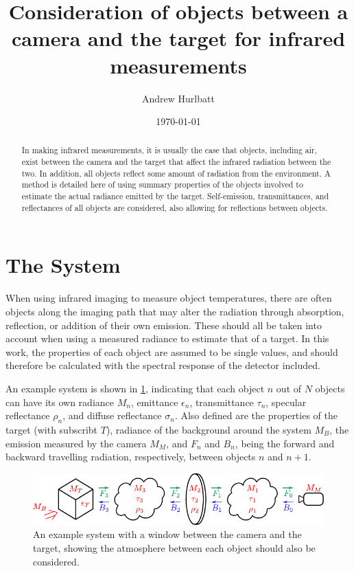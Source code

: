 \documentclass[11pt,a4paper]{article}
\title{Consideration of objects between a camera and the target for infrared measurements}
\author{Andrew Hurlbatt}
\date{\today}
\begin{document}
	
	\maketitle
	
	\begin{abstract}
		In making infrared measurements, it is usually the case that objects, including air, exist between the camera and the target that affect the infrared radiation between the two. In addition, all objects reflect some amount of radiation from the environment. A method is detailed here of using summary properties of the objects involved to estimate the actual radiance emitted by the target. Self-emission, transmittances, and reflectances of all objects are considered, also allowing for reflections between objects.
	\end{abstract}

\section*{The System}

When using infrared imaging to measure object temperatures, there are often objects along the imaging path that may alter the radiation through absorption, reflection, or addition of their own emission. These should all be taken into account when using a measured radiance to estimate that of a target. In this work, the properties of each object are assumed to be single values, and should therefore be calculated with the spectral response of the detector included. 

An example system is shown in \cref{fig:scheme}, indicating that each object $ n $ out of $ N $ objects can have its own radiance $ M_n $, emittance $ \epsilon_n $, transmittance $ \tau_n $, specular reflectance $ \rho_n $, and diffuse reflectance $ \sigma_n $. Also defined are the properties of the target (with subscribt $ T $), radiance of the background around the system $ M_B $, the emission measured by the camera $ M_M $, and $ F_n $ and $ B_n $, being the forward and backward travelling radiation, respectively, between objects $ n $ and $ n+1 $.

\begin{figure}
	\centering
	\includegraphics[width=\textwidth]{./infroptics_scheme.pdf}
	\caption{An example system with a window between the camera and the target, showing the atmosphere between each object should also be considered.}
	\label{fig:scheme}
\end{figure}
\end{document}
